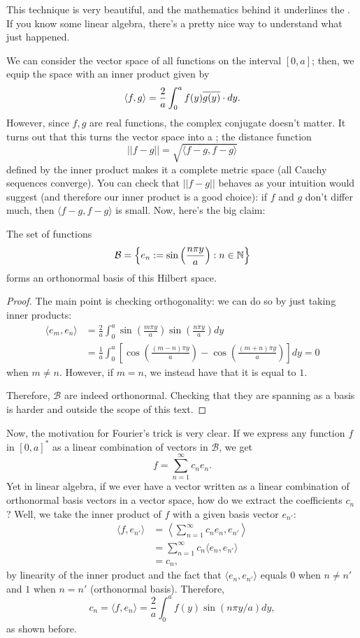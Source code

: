 This technique is very beautiful, and the mathematics behind it underlines the . If you know some linear algebra, there's a pretty nice way to understand what just happened.

We can consider the vector space of all functions on the interval $[0,a]$; then, we equip the space with an inner product given by
\[\langle f,g\rangle = \frac{2}{a}\int_0^af(y)\overline{g(y)}\cdot dy.\]
However, since $f,g$ are real functions, the complex conjugate doesn't matter. It turns out that this turns the vector space into a ; the distance function
\[||f-g||=\sqrt{\langle f-g, f-g\rangle}\]
defined by the inner product makes it a complete metric space (all Cauchy sequences converge). You can check that $||f-g||$ behaves as your intuition would suggest (and therefore our inner product is a good choice): if $f$ and $g$ don't differ much, then $\langle f-g,f-g\rangle$ is small. Now, here's the big claim:

\begin{claim}
The set of functions 
\[\mathcal{B}=\left\{e_n:=\sin\left(\frac{n\pi y}{a}\right):n\in \mathbb N\right\}\]
forms an orthonormal basis of this Hilbert space.
\end{claim}

\begin{proof}
The main point is checking orthogonality: we can do so by just taking inner products:
\begin{align*}
\langle e_m,e_n\rangle &= \frac{2}{a}\int_0^a \sin\left(\frac{m\pi y}{a}\right)\sin\left(\frac{n\pi y}{a}\right)dy\\
&=\frac{1}{a}\int_0^a\left[\cos\left(\frac{(m-n)\pi y}{a}\right)-\cos\left(\frac{(m+n)\pi y}{a}\right)\right]dy=0
\end{align*}
when $m\neq n$. However, if $m=n$, we instead have that it is equal to $1$.

Therefore, $\mathcal{B}$ are indeed orthonormal. Checking that they are spanning as a basis is harder and outside the scope of this text.
\end{proof}

Now, the motivation for Fourier's trick is very clear. If we express any function $f$ in $[0,a]^*$ as a linear combination of vectors in $\mathcal{B}$, we get
\[f=\sum_{n=1}^\infty c_ne_n.\]
Yet in linear algebra, if we ever have a vector written as a linear combination of orthonormal basis vectors in a vector space, how do we extract the coefficients $c_n$? Well, we take the inner product of $f$ with a given basis vector $e_{n'}$:
\begin{align*}
\langle f,e_{n'}\rangle&=\left\langle \sum_{n=1}^\infty c_ne_n, e_{n'}\right\rangle\\
&=\sum_{n=1}^\infty c_n\langle e_n, e_{n'}\rangle\\
&=c_n,
\end{align*}
by linearity of the inner product and the fact that $\langle e_n, e_{n'}\rangle$ equals $0$ when $n\neq n'$ and $1$ when $n=n'$ (orthonormal basis). Therefore,
\[c_n=\langle f,e_n\rangle = \frac{2}{a}\int_0^af(y)\sin(n\pi y/a)dy,\]
as shown before.

